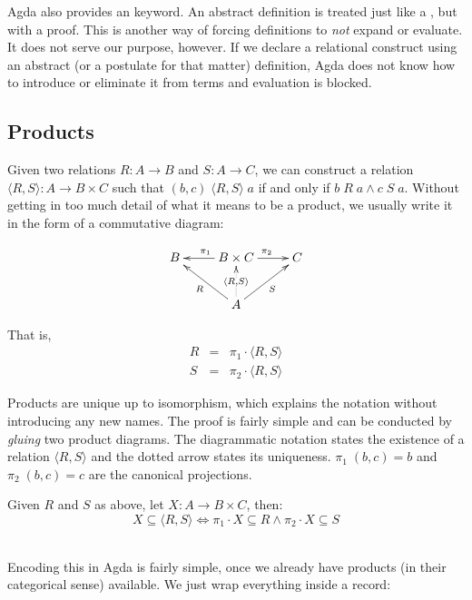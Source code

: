
Agda also provides an  keyword. An abstract definition is treated just
like a , but with a proof. This is another way of forcing definitions to \emph{not}
expand or evaluate. It does not serve our purpose, however. If we declare a relational construct
using an abstract (or a postulate for that matter) definition, Agda does not know
how to introduce or eliminate it from terms and evaluation is blocked.


\subsection{Products}
\label{sec:relations:products}

Given two relations $R : A \rightarrow B$ and $S : A \rightarrow C$, we can construct a relation
$\langle R , S \rangle : A \rightarrow B \times C$ such that $(b,c)\;\langle R , S \rangle\;a$ if and only if $b\;R\;a \wedge c\;S\;a$.
Without getting in too much detail of what it means to be a product, we usually write
it in the form of a commutative diagram:

\begin{displaymath}
\xymatrix{%
B & B \times C \ar[l]_{\pi_1} \ar[r]^{\pi_2} & C \\
  &     A \ar@{..>}[u]|{\langle R , S \rangle} \ar[ul]^{R} \ar[ur]_{S}
  &
}
\end{displaymath} 

That is,
\begin{eqnarray*}
  R &=& \pi_1 \cdot \langle R , S \rangle \\
  S &=& \pi_2 \cdot \langle R , S \rangle
\end{eqnarray*}

Products are unique up to isomorphism, which explains the notation without introducing any new names.
The proof is fairly simple and can be conducted by \emph{gluing} two product diagrams.
The diagrammatic notation states the existence of a relation $\langle R , S \rangle$ and the dotted arrow
states its uniqueness. $\pi_1\;(b , c) = b$ and $\pi_2\;(b , c) = c$ are the canonical
projections.\\

\begin{mydef}
Given $R$ and $S$ as above, let $X : A \rightarrow B \times C$, then:
\[
  X \subseteq \langle R , S \rangle \Leftrightarrow \pi_1 \cdot X \subseteq R \wedge \pi_2 \cdot X \subseteq S
\]\\
\end{mydef}
Encoding this in Agda is fairly simple, once we already have products (in their categorical sense)
available. We just wrap everything inside a record:

